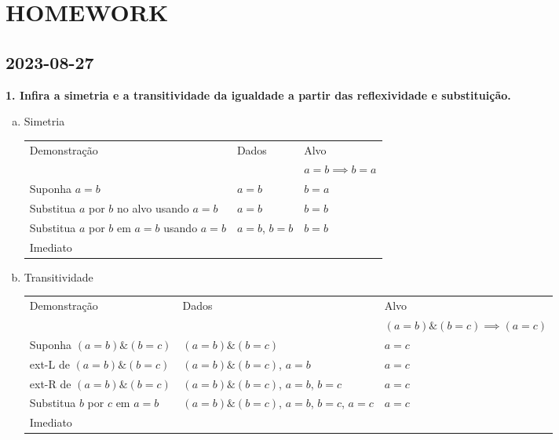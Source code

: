 \documentclass[a4paper, 12pt]{article}
\begin{document}
\section{HOMEWORK}
\subsection{2023-08-27}

\textbf{1. Infira a simetria e a transitividade da igualdade a partir das reflexividade e substituição.}
\begin{enumerate}[a.]
    \item Simetria
    \begin{table}[h!]
        \centering
        \begin{tabular}{|p{4cm} | p{4cm} | p{4cm} |}
        \rowcolor{gray!50}
            Demonstração & Dados & Alvo \\
            && $a = b \implies b = a$  \\
            Suponha $a = b$ & $a = b$ & $b = a$\\
            Substitua $a$ por $b$ no alvo usando $a = b$ & $a=b$&$b=b$\\
            Substitua $a$ por $b$ em $a = b$ usando $a=b$ & $a=b$, $b=b$&$b=b$\\
            Imediato &&\\
            \hline
            \end{tabular}
    \end{table}

    \item Transitividade
    \begin{table}[h!]
        \centering
        \begin{tabular}{|p{4cm} | p{4cm} | p{4cm} |}
        \rowcolor{gray!50}
            Demonstração & Dados & Alvo \\
            && $(a = b) \& (b = c) \implies (a = c)$  \\
            Suponha $(a = b) \& (b =c)$ & $(a = b) \& (b =c)$ & $a=c$\\
            ext-L de $(a = b) \& (b =c)$ & $(a = b) \& (b =c)$, $a=b$ & $a = c$\\
            ext-R de $(a = b) \& (b =c)$ & $(a = b) \& (b =c)$, $a=b$, $b=c$ & $a=c$\\
            Substitua $b$ por $c$ em $a=b$ & $(a = b) \& (b =c)$, $a=b$, $b=c$, $a=c$ & $a=c$\\
            Imediato & & \\
            \hline
            \end{tabular}
    \end{table}
\end{enumerate}
\end{document}
